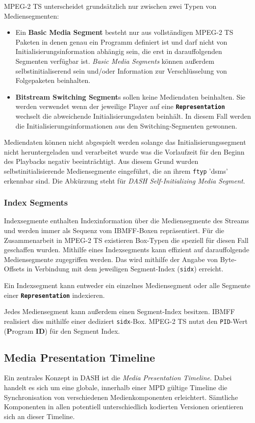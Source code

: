 \documentclass[paper = a4, fontsize = 12pt, parskip = half]{scrartcl} %
\def\attr#1{\texttt{#1}}
\def\elem#1{\texttt{\textbf{#1}}}
\begin{document}
MPEG-2 TS unterscheidet grundsätzlich nur zwischen zwei Typen von Mediensegmenten:
\begin{itemize}
	\item Ein \textbf{Basic Media Segment} besteht nur aus vollständigen MPEG-2 TS Paketen in denen genau ein Programm definiert ist und darf nicht von Initialisierungsinformation abhängig sein, die erst in darauffolgenden Segmenten verfügbar ist. \textit{Basic Media Segments} können außerdem selbstinitialiserend sein und/oder Information zur Verschlüsselung von Folgepaketen beinhalten.
	\item \textbf{Bitstream Switching Segment}s sollen keine Mediendaten beinhalten. Sie werden verwendet wenn der jeweilige Player auf eine \elem{Representation} wechselt die abweichende Initialisierungsdaten beinhält. In diesem Fall werden die Initialisierungsinformationen aus den Switching-Segmenten gewonnen.
\end{itemize}

Mediendaten können nicht abgespielt werden solange das Initialisierungssegment nicht heruntergeladen und verarbeitet wurde was die Vorlaufzeit für den Beginn des Playbacks negativ beeinträchtigt. Aus diesem Grund wurden selbstinitialisierende Mediensegmente eingeführt, die an ihrem \attr{ftyp} 'dsms' erkennbar sind. Die Abkürzung steht für \textit{DASH Self-Initializing Media Segment}.

\subsubsection{Index Segments}
Indexsegmente enthalten Indexinformation über die Mediensegmente des Streams und werden immer als Sequenz vom IBMFF-Boxen repräsentiert. Für die Zusammenarbeit in MPEG-2 TS existieren Box-Typen die speziell für diesen Fall geschaffen wurden.
Mithilfe eines Indexsegments kann effizient auf darauffolgende Mediensegmente zugegriffen werden. Das wird mithilfe der Angabe von Byte-Offsets in Verbindung mit dem jeweiligen Segment-Index (\attr{sidx}) erreicht.

Ein Indexsegment kann entweder ein einzelnes Mediensegment oder alle Segmente einer \elem{Representation} indexieren.

Jedes Mediensegment kann außerdem einen Segment-Index besitzen. IBMFF realisiert dies mithilfe einer dediziert \attr{sidx}-Box. MPEG-2 TS nutzt den \attr{PID}-Wert (\textbf{P}rogram \textbf{ID}) für den Segment Index. 

\subsection{Media Presentation Timeline}
Ein zentrales Konzept in DASH ist die \textit{Media Presentation Timeline}. Dabei handelt es sich um eine globale, innerhalb einer MPD gültige Timeline die Synchronisation von verschiedenen Medienkomponenten erleichtert. Sämtliche Komponenten in allen potentiell unterschiedlich kodierten Versionen orientieren sich an dieser Timeline.
\end{document}
